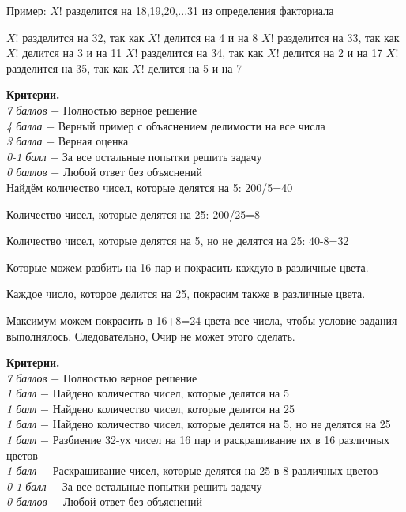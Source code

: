 Пример: $X!$ разделится на 18,19,20,...31 из определения факториала\par
$X!$ разделится на 32, так как $X!$ делится на 4 и на 8
$X!$ разделится на 33, так как $X!$ делится на 3 и на 11
$X!$ разделится на 34, так как $X!$ делится на 2 и на 17
$X!$ разделится на 35, так как $X!$ делится на 5 и на 7

\textbf{Критерии.} \\
\textit{7 баллов} $-$ Полностью верное решение\\
\textit{4 балла} $-$ Верный пример с объяснением делимости на все числа\\
\textit{3 балла} $-$ Верная оценка\\
\textit{0-1 балл} $-$ За все остальные попытки решить задачу\\
\textit{0 баллов} $-$ Любой ответ без объяснений\\


 Найдём количество чисел, которые делятся на 5: 200/5=40

Количество чисел, которые делятся на 25: 200/25=8

Количество чисел, которые делятся на 5, но не делятся на 25: 40-8=32

Которые можем разбить на 16 пар и покрасить каждую в различные цвета.

Каждое число, которое делится на 25, покрасим также в различные цвета.

Максимум можем покрасить в 16+8=24 цвета все числа, чтобы условие задания выполнялось. Следовательно, Очир не может этого сделать.\par

\textbf{Критерии.} \\
\textit{7 баллов} $-$ Полностью верное решение\\
\textit{1 балл} $-$ Найдено количество чисел, которые делятся на 5\\
\textit{1 балл} $-$ Найдено количество чисел, которые делятся на 25\\
\textit{1 балл} $-$ Найдено количество чисел, которые делятся на 5, но не делятся на 25\\ 
\textit{1 балл} $-$ Разбиение 32-ух чисел на 16 пар и раскрашивание их в 16 различных цветов\\
\textit{1 балл} $-$ Раскрашивание чисел, которые делятся на 25 в 8 различных цветов\\
\textit{0-1 балл} $-$ За все остальные попытки решить задачу\\
\textit{0 баллов} $-$ Любой ответ без объяснений\\


